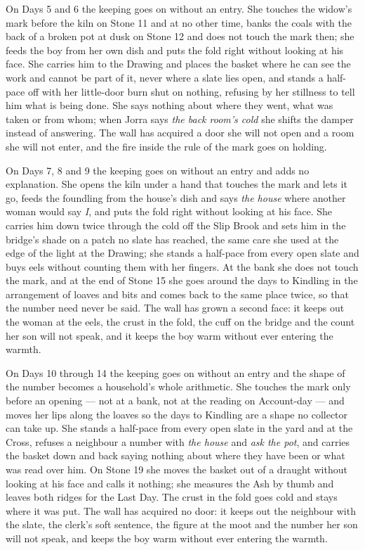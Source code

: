 \documentclass{design/chronicle}
\begin{document}
{On Days 5 and 6 the keeping goes on without an entry. She touches the widow’s mark before the kiln on Stone 11 and at no other time, banks the coals with the back of a broken pot at dusk on Stone 12 and does not touch the mark then; she feeds the boy from her own dish and puts the fold right without looking at his face. She carries him to the Drawing and places the basket where he can see the work and cannot be part of it, never where a slate lies open, and stands a half-pace off with her little-door burn shut on nothing, refusing by her stillness to tell him what is being done. She says nothing about where they went, what was taken or from whom; when Jorra says \emph{the back room’s cold} she shifts the damper instead of answering. The wall has acquired a door she will not open and a room she will not enter, and the fire inside the rule of the mark goes on holding.

On Days 7, 8 and 9 the keeping goes on without an entry and adds no explanation. She opens the kiln under a hand that touches the mark and lets it go, feeds the foundling from the house’s dish and says \emph{the house} where another woman would say \emph{I}, and puts the fold right without looking at his face. She carries him down twice through the cold off the Slip Brook and sets him in the bridge’s shade on a patch no slate has reached, the same care she used at the edge of the light at the Drawing; she stands a half-pace from every open slate and buys eels without counting them with her fingers. At the bank she does not touch the mark, and at the end of Stone 15 she goes around the days to Kindling in the arrangement of loaves and bits and comes back to the same place twice, so that the number need never be said. The wall has grown a second face: it keeps out the woman at the eels, the crust in the fold, the cuff on the bridge and the count her son will not speak, and it keeps the boy warm without ever entering the warmth.

On Days 10 through 14 the keeping goes on without an entry and the shape of the number becomes a household’s whole arithmetic. She touches the mark only before an opening --- not at a bank, not at the reading on Account-day --- and moves her lips along the loaves so the days to Kindling are a shape no collector can take up. She stands a half-pace from every open slate in the yard and at the Cross, refuses a neighbour a number with \emph{the house} and \emph{ask the pot}, and carries the basket down and back saying nothing about where they have been or what was read over him. On Stone 19 she moves the basket out of a draught without looking at his face and calls it nothing; she measures the Ash by thumb and leaves both ridges for the Last Day. The crust in the fold goes cold and stays where it was put. The wall has acquired no door: it keeps out the neighbour with the slate, the clerk’s soft sentence, the figure at the moot and the number her son will not speak, and keeps the boy warm without ever entering the warmth.

}
\end{document}
